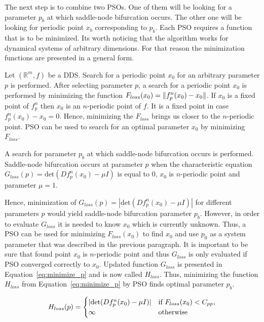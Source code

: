 \par
The next step is to combine two PSOs.
One of them will be looking for a parameter $p_b$ at which saddle-node bifurcation occurs.
The other one will be looking for periodic point $x_b$ corresponding to $p_b$.
Each PSO requires a function that is to be minimized.
Its worth noticing that the algorithm works for dynamical systems of arbitrary dimensions.
For that reason the minimization functions are presented in a general form.
\par
Let $(\mathbb{R}^{m}, f)$ be a DDS.
Search for a periodic point $x_0$ for an arbitrary parameter $p$ is performed.
After selecting parameter $p$, a search for a periodic point $x_0$ is performed by minimizing the function $F_{loss}(x_0) = \lVert f^{n}_{p}(x_0)-x_0\rVert$.
If $x_0$ is a fixed point of $f^{n}_{p}$ then $x_0$ is an $n$-periodic point of $f$.
It is a fixed point in case $f^{n}_{p}(x_0)-x_0 = 0$.
Hence, minimizing the $F_{loss}$ brings us closer to the $n$-periodic point.
PSO can be used to search for an optimal parameter $x_0$ by minimizing $F_{loss}$.
\par
A search for parameter $p_b$ at which saddle-node bifurcation occurs is performed.
Saddle-node bifurcation occurs at parameter $p$ when the characteristic equation $G_{loss}(p) = \text{det}(Df^{n}_{p}(x_0)-\mu I)$ is equal to $0$, $x_0$ is $n$-periodic point and parameter $\mu = 1$.
\par
Hence, minimization of $G_{loss}(p) = |\text{det}(Df^{n}_{p}(x_0)-\mu I)|$ for different parameters $p$ would yield saddle-node bifurcation parameter $p_b$.
However, in order to evaluate $G_{loss}$ it is needed to know $x_0$ which is currently unknown.
Thus, a PSO can be used for minimizing $F_{loss}(x_{0})$ to find $x_0$ and use $p_0$ as a system parameter that was described in the previous paragraph.
It is important to be sure that found point $x_0$ is $n$-periodic point and thus $G_{loss}$ is only evaluated if PSO converged correctly to $x_0$.
Updated function $G_{loss}$ is presented in Equation~\eqref{eq:minimize_p} and is now called $H_{loss}$.
Thus, minimizing the function $H_{loss}$ from Equation~\eqref{eq:minimize_p} by PSO finds optimal parameter $p_b$.

\begin{equation}
\label{eq:minimize_p}
    H_{loss}(p) =
    \begin{cases}
        |\text{det}(Df^{n}_{p}(x_0)-\mu I)| & \text{if } F_{loss}(x_0) < C_{pp}, \\
        \infty & \rm{otherwise}
    \end{cases}
\end{equation}

